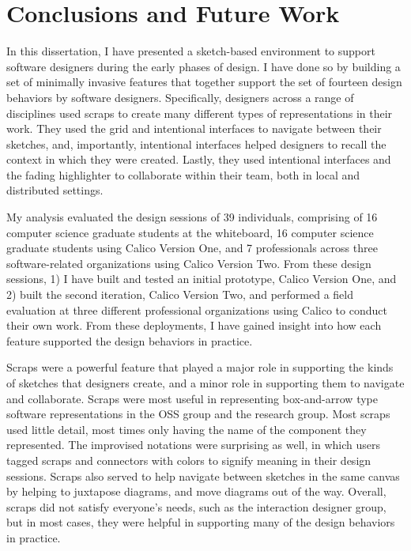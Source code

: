 \chapter{Conclusions and Future Work}
\label{chapter:conclusions}


In this dissertation, I have presented a sketch-based environment to support software designers during the early phases of design. I have done so by building a set of minimally invasive features that together support the set of fourteen design behaviors by software designers. Specifically, designers across a range of disciplines used scraps to create many different types of representations in their work. They used the grid and intentional interfaces to navigate between their sketches, and, importantly, intentional interfaces helped designers to recall the context in which they were created. Lastly, they used intentional interfaces and the fading highlighter to collaborate within their team, both in local and distributed settings.

My analysis evaluated the design sessions of 39 individuals, comprising of 16 computer science graduate students at the whiteboard, 16 computer science graduate students using Calico Version One, and 7 professionals across three software-related organizations using Calico Version Two. From these design sessions, 1) I have built and tested an initial prototype, Calico Version One, and 2) built the second iteration, Calico Version Two, and performed a field evaluation at three different professional organizations using Calico to conduct their own work. From these deployments, I have gained insight into how each feature supported the design behaviors in practice.

Scraps were a powerful feature that played a major role in supporting the kinds of sketches that designers create, and a minor role in supporting them to navigate and collaborate. Scraps were most useful in representing box-and-arrow type software representations in the OSS group and the research group. Most scraps used little detail, most times only having the name of the component they represented. The improvised notations were surprising as well, in which users tagged scraps and connectors with colors to signify meaning in their design sessions. Scraps also served to help navigate between sketches in the same canvas by helping to juxtapose diagrams, and move diagrams out of the way. Overall, scraps did not satisfy everyone's needs, such as the interaction designer group, but in most cases, they were helpful in supporting many of the design behaviors in practice.

